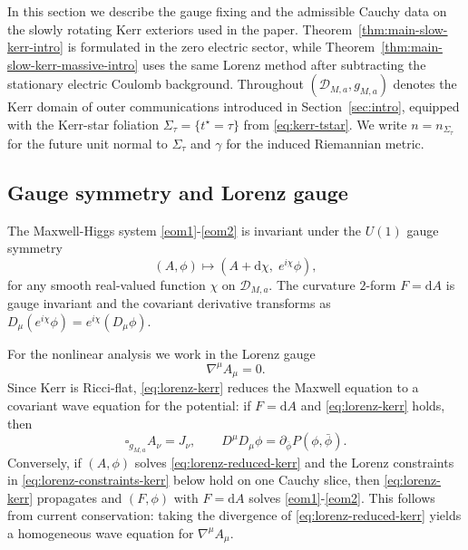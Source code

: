 \documentclass[11pt]{article}
\numberwithin{equation}{section}
\theoremstyle{plain}
\theoremstyle{definition}
\theoremstyle{remark}
\newcommand{\dd}{\mathrm{d}}
\begin{document}
In this section we describe the gauge fixing and the admissible Cauchy data on the slowly rotating Kerr exteriors used in the paper.  Theorem~\ref{thm:main-slow-kerr-intro} is formulated in the zero electric sector, while Theorem~\ref{thm:main-slow-kerr-massive-intro} uses the same Lorenz method after subtracting the stationary electric Coulomb background.
Throughout $(\mathcal D_{M,a},g_{M,a})$ denotes the Kerr domain of outer communications introduced in Section~\ref{sec:intro}, equipped with the Kerr-star foliation
$\Sigma_{\tau}=\{t^{\star}=\tau\}$ from \eqref{eq:kerr-tstar}.
We write $n=n_{\Sigma_{\tau}}$ for the future unit normal to $\Sigma_{\tau}$ and $\gamma$ for the induced Riemannian metric.

\subsection{Gauge symmetry and Lorenz gauge}\label{subsec:kerr-lorenz}

The Maxwell-Higgs system \eqref{eom1}-\eqref{eom2} is invariant under the $U(1)$ gauge symmetry
\begin{equation}\label{eq:gauge-transform}
(A,\phi)\longmapsto (A+\dd\chi,\;e^{i\chi}\phi),
\end{equation}
for any smooth real-valued function $\chi$ on $\mathcal D_{M,a}$.
The curvature $2$-form $F=\dd A$ is gauge invariant and the covariant derivative transforms as
$D_{\mu}(e^{i\chi}\phi)=e^{i\chi}(D_{\mu}\phi)$.

For the nonlinear analysis we work in the Lorenz gauge
\begin{equation}\label{eq:lorenz-kerr}
\nabla^{\mu}A_{\mu}=0.
\end{equation}
Since Kerr is Ricci-flat, \eqref{eq:lorenz-kerr} reduces the Maxwell equation to a covariant wave equation for the potential:
if $F=\dd A$ and \eqref{eq:lorenz-kerr} holds, then
\begin{equation}\label{eq:lorenz-reduced-kerr}
\square_{g_{M,a}}A_{\nu}=J_{\nu},
\qquad
D^{\mu}D_{\mu}\phi=\partial_{\bar\phi}P(\phi,\bar\phi).
\end{equation}
Conversely, if $(A,\phi)$ solves \eqref{eq:lorenz-reduced-kerr} and the Lorenz constraints in
\eqref{eq:lorenz-constraints-kerr} below hold on one Cauchy slice, then \eqref{eq:lorenz-kerr} propagates and $(F,\phi)$ with $F=\dd A$ solves \eqref{eom1}-\eqref{eom2}.
This follows from current conservation: taking the divergence of \eqref{eq:lorenz-reduced-kerr} yields a homogeneous wave equation for $\nabla^{\mu}A_{\mu}$.
\end{document}
